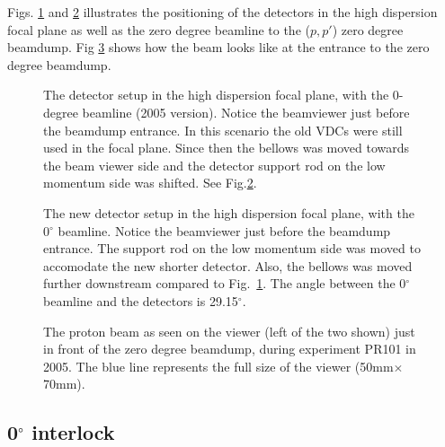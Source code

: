 \documentclass[11pt]{report}
\begin{document}
Figs. \ref{fig:detec-hdisp} and \ref{fig:detec-hdisp-new}
illustrates the positioning of the detectors in the high dispersion focal plane as
well as the zero degree beamline to the ($p,p'$) zero degree beamdump.
Fig \ref{fig:0degr-beamdump-viewer} shows how the beam looks like
at the entrance to the zero degree beamdump.


\begin{figure}[!h]
\centerline{\vspace{0cm}\hspace{0cm}
}
\centering
\caption{The detector setup in the high dispersion focal plane, with the 0-degree
beamline (2005 version). Notice the beamviewer just before the beamdump entrance. 
In this scenario the old VDCs were still used in the focal plane.
Since then the bellows was moved towards the beam viewer side and the detector
support rod on the low momentum side was shifted. 
See Fig.\ref{fig:detec-hdisp-new}. }
\label{fig:detec-hdisp}
\end{figure} 


\begin{figure}[!h]
\centerline{\vspace{0cm}\hspace{0cm}
}
\centering
\caption{The new detector setup in the high dispersion focal plane, with the 0$^{\circ}$
beamline. Notice the beamviewer just before the beamdump entrance.
The support rod on the low momentum side was moved to accomodate the new shorter
detector.  Also, the bellows was moved further downstream compared to Fig.~\ref{fig:detec-hdisp}.
The angle between the 0$^{\circ}$ beamline and the detectors is 29.15$^{\circ}$.}
\label{fig:detec-hdisp-new}
\end{figure} 

\begin{figure}[!h]
\centerline{\vspace{0cm}\hspace{0cm}
}
\centering
\caption{The proton beam as seen on the viewer (left of the two shown) just in front of the zero degree beamdump, 
during experiment PR101 in 2005. The blue line represents the full size of the viewer (50mm$\times$70mm).}
\label{fig:0degr-beamdump-viewer}
\end{figure} 


\subsection{0$^{\circ}$ interlock}\label{sec:zero-interlock}
\end{document}
